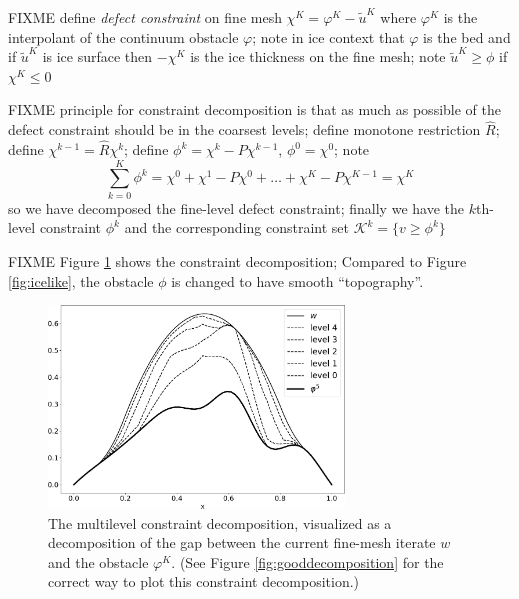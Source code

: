 \documentclass[letterpaper,final,12pt,reqno]{amsart}
\numberwithin{equation}{section}
\numberwithin{figure}{section}
\numberwithin{table}{section}
\begin{document}
FIXME define \emph{defect constraint} on fine mesh $\chi^K = \varphi^K - \tilde u^K$ where $\varphi^K$ is the interpolant of the continuum obstacle $\varphi$; note in ice context that $\varphi$ is the bed and if $\tilde u^K$ is ice surface then $-\chi^K$ is the ice thickness on the fine mesh; note $\tilde u^K \ge \phi$ if $\chi^K \le 0$

FIXME principle for constraint decomposition is that as much as possible of the defect constraint should be in the coarsest levels; define monotone restriction $\hat R$; define $\chi^{k-1} = \hat R \chi^k$; define $\phi^k = \chi^k - P\chi^{k-1}$, $\phi^0=\chi^0$; note
\begin{equation}
  \sum_{k=0}^K \phi^k = \chi^0 + \chi^1 - P \chi^0 + \dots + \chi^K - P\chi^{K-1} = \chi^K  \label{eq:telescopingdecomposition}
\end{equation}
so we have decomposed the fine-level defect constraint; finally we have the $k$th-level constraint $\phi^k$ and the corresponding constraint set $\mathcal{K}^k = \{v \ge \phi^k\}$

FIXME Figure \ref{fig:icelikedecomposition} shows the constraint decomposition;  Compared to Figure \ref{fig:icelike}, the obstacle $\phi$ is changed to have smooth ``topography''.

\begin{figure}
\includegraphics[width=0.7\textwidth]{fixfigs/icedec_defect.pdf}
\caption{The multilevel constraint decomposition, visualized as a decomposition of the gap between the current fine-mesh iterate $w$ and the obstacle $\varphi^K$.  (See Figure \ref{fig:gooddecomposition} for the correct way to plot this constraint decomposition.)}
\label{fig:icelikedecomposition}
\end{figure}
\end{document}
